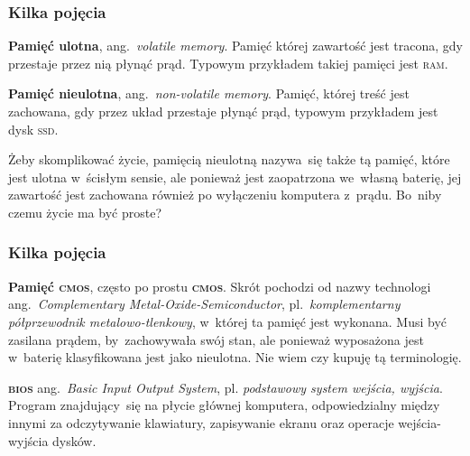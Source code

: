 \documentclass[10pt,t]{beamer}
\begin{document}
\begin{frame}
  \frametitle{Kilka pojęcia}


  \textbf{Pamięć ulotna}, ang.~\textit{volatile memory}. Pamięć której
  zawartość jest tracona, gdy przestaje przez nią płynąć prąd. Typowym
  przykładem takiej pamięci jest \textsc{ram}.

  \textbf{Pamięć nieulotna}, ang.~\textit{non-volatile memory}. Pamięć,
  której treść jest zachowana, gdy przez układ przestaje płynąć prąd,
  typowym przykładem jest dysk \textsc{ssd}.

  Żeby skomplikować życie, pamięcią nieulotną nazywa~się także tą pamięć,
  które jest ulotna w~ścisłym sensie, ale ponieważ jest zaopatrzona
  we~własną baterię, jej zawartość jest zachowana również po wyłączeniu
  komputera z~prądu. Bo~niby czemu życie ma być proste?

\end{frame}





\begin{frame}
  \frametitle{Kilka pojęcia}


  \textbf{Pamięć \textsc{cmos}}, często po prostu \textbf{\textsc{cmos}}.
  Skrót pochodzi od nazwy technologi ang.~\textit{Complementary
    Metal-Oxide-Semiconductor}, pl.~\textit{komplementarny półprzewodnik
    metalowo-tlenkowy}, w~której ta pamięć jest wykonana. Musi być zasilana
  prądem, by~zachowywała swój stan, ale ponieważ wyposażona jest w~baterię
  klasyfikowana jest jako nieulotna. Nie wiem czy kupuję tą terminologię.

  \textbf{\textsc{bios}} ang.~\textit{Basic Input Output System}, pl.
  \textit{podstawowy system wejścia, wyjścia}. Program znajdujący~się
  na płycie głównej komputera, odpowiedzialny między innymi za odczytywanie
  klawiatury, zapisywanie ekranu oraz operacje wejścia-wyjścia dysków.

\end{frame}
\end{document}
